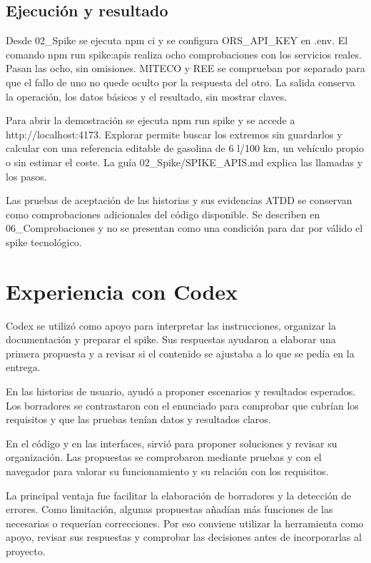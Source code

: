 \documentclass[11pt,a4paper]{article}
\begin{document}
\subsection*{Ejecución y resultado}
Desde 02\_Spike se ejecuta npm ci y se configura ORS\_API\_KEY en .env. El comando npm run spike:apis realiza ocho comprobaciones con los servicios reales. Pasan las ocho, sin omisiones. MITECO y REE se comprueban por separado para que el fallo de uno no quede oculto por la respuesta del otro. La salida conserva la operación, los datos básicos y el resultado, sin mostrar claves.\par
Para abrir la demostración se ejecuta npm run spike y se accede a http://localhost:4173. Explorar permite buscar los extremos sin guardarlos y calcular con una referencia editable de gasolina de 6 l/100 km, un vehículo propio o sin estimar el coste. La guía 02\_Spike/SPIKE\_APIS.md explica las llamadas y los pasos.\par
Las pruebas de aceptación de las historias y sus evidencias ATDD se conservan como comprobaciones adicionales del código disponible. Se describen en 06\_Comprobaciones y no se presentan como una condición para dar por válido el spike tecnológico.\par
\clearpage
\section{Experiencia con Codex}\label{sec7}
Codex se utilizó como apoyo para interpretar las instrucciones, organizar la documentación y preparar el spike. Sus respuestas ayudaron a elaborar una primera propuesta y a revisar si el contenido se ajustaba a lo que se pedía en la entrega.\par
En las historias de usuario, ayudó a proponer escenarios y resultados esperados. Los borradores se contrastaron con el enunciado para comprobar que cubrían los requisitos y que las pruebas tenían datos y resultados claros.\par
En el código y en las interfaces, sirvió para proponer soluciones y revisar su organización. Las propuestas se comprobaron mediante pruebas y con el navegador para valorar su funcionamiento y su relación con los requisitos.\par
La principal ventaja fue facilitar la elaboración de borradores y la detección de errores. Como limitación, algunas propuestas añadían más funciones de las necesarias o requerían correcciones. Por eso conviene utilizar la herramienta como apoyo, revisar sus respuestas y comprobar las decisiones antes de incorporarlas al proyecto.\par
\end{document}
